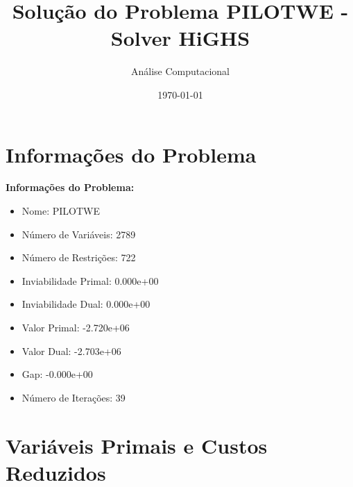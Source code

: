 \documentclass[12pt]{article}
\title{Solução do Problema PILOTWE - Solver HiGHS}
\author{Análise Computacional}
\date{\today}
\begin{document}
\maketitle

\section{Informações do Problema}

\textbf{Informações do Problema:}
\begin{itemize}
\item Nome: PILOTWE
\item Número de Variáveis: 2789
\item Número de Restrições: 722
\item Inviabilidade Primal: 0.000e+00
\item Inviabilidade Dual: 0.000e+00
\item Valor Primal: -2.720e+06
\item Valor Dual: -2.703e+06
\item Gap: -0.000e+00
\item Número de Iterações: 39
\end{itemize}


\section{Variáveis Primais e Custos Reduzidos}
\end{document}
